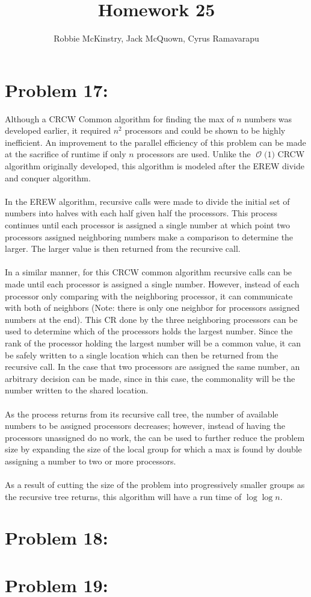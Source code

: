 \documentclass[12pt]{article}
\newcommand{\BigO}[1]{\ensuremath{\operatorname{\mathcal{O}}\bigl(#1\bigr)}}
\begin{document}
\title{Homework 25}
\author{Robbie McKinstry, Jack McQuown, Cyrus Ramavarapu}
\renewcommand{\today}{31 October 2016}
\renewcommand{\baselinestretch}{1.5}
\maketitle

\section*{Problem 17: }
Although a CRCW Common algorithm for finding the max of $n$ numbers
was developed earlier, it required $n^2$ processors and could be shown
to be highly inefficient.  An improvement to the parallel efficiency of
this problem can be made at the sacrifice of runtime if only $n$ 
processors are used.  Unlike the \BigO{1} CRCW algorithm originally
developed, this algorithm is modeled after the EREW divide and
conquer algorithm.\\\\
In the EREW algorithm, recursive calls were made to divide the 
initial set of numbers into halves with each half given half
the processors.  This process continues until each processor
is assigned a single number at which point two processors
assigned neighboring numbers make a comparison to determine the
larger.  The larger value is then returned from the recursive
call.\\\\
In a similar manner, for this CRCW common algorithm recursive
calls can be made until each processor is assigned a single 
number.  However, instead of each processor only comparing
with the neighboring processor, it can communicate with both
of neighbors (Note: there is only one neighbor for processors
assigned numbers at the end).  This CR done by the three 
neighboring processors can be used to determine which of 
the processors holds the largest number.  Since the rank
of the processor holding the largest number will be
a common value, it can be safely written to a single location
which can then be returned from the recursive call.  In the
case that two processors are assigned the same number,
an arbitrary decision can be made, since in this case,
the commonality will be the number written to the shared
location.\\\\
As the process returns from its recursive call tree, the number of
available numbers to be assigned processors decreases; however,
instead of having the processors unassigned do no work, the can be
used to further reduce the problem size by expanding the size
of the local group for which a max is found by double assigning
a number to two or more processors.\\\\ 
As a result of cutting the size of the problem into progressively
smaller groups as the recursive tree returns, this algorithm
will have a run time of $\log \log n$.
\section*{Problem 18: }
\section*{Problem 19: }
\end{document}
